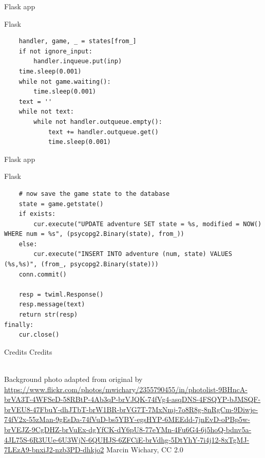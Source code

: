 \documentclass{beamer}
\def\py{
  \lstset{
     language=Python,
     extendedchars=true,
     basicstyle=\footnotesize\ttfamily,
     showstringspaces=false,
     showspaces=false,
     numbersep=9pt,
     tabsize=2,
     breaklines=true,
     showtabs=false,
     captionpos=b
  }
}
\begin{document}
\begin{frame}[fragile]{Flask app}
\begin{block}{Flask}
\py
\begin{lstlisting}
    handler, game, _ = states[from_]
    if not ignore_input:
        handler.inqueue.put(inp)
    time.sleep(0.001)
    while not game.waiting():
        time.sleep(0.001)
    text = ''
    while not text:
        while not handler.outqueue.empty():
            text += handler.outqueue.get()
            time.sleep(0.001)
\end{lstlisting}
\end{block}
\end{frame}
\begin{frame}[fragile]{Flask app}
\begin{block}{Flask}
\py
\begin{lstlisting}
    # now save the game state to the database
    state = game.getstate()
    if exists:
        cur.execute("UPDATE adventure SET state = %s, modified = NOW() WHERE num = %s", (psycopg2.Binary(state), from_))
    else:
        cur.execute("INSERT INTO adventure (num, state) VALUES (%s,%s)", (from_, psycopg2.Binary(state)))
    conn.commit()

    resp = twiml.Response()
    resp.message(text)
    return str(resp)
finally:
    cur.close()
\end{lstlisting}
\end{block}
\end{frame}

\begin{frame}{Credits}
Credits

\ \\
Background photo adapted from original by \url{https://www.flickr.com/photos/mwichary/2355790455/in/photolist-9BHncA-brVA3T-4WFSeD-58RBtP-4Ab3qP-brVJQK-74fVg4-asqDNS-4FSQYP-bJMSQF-brVEU8-47FbuY-dhJTbT-brW1BR-brVG7T-7MxNmj-7o8R8g-8nRgCm-9Diwje-74fV2x-55zMan-9gEsDa-74fVuD-bs5YBY-egsHYP-6MEEdd-7jnEvD-oPBp5w-brVEJZ-9CgDHZ-brVuEx-dgYfCK-dY6pU8-77eYMn-4Fu6G4-6j5hoQ-bdnv5a-4JL75S-6R3UUe-6U3WjN-6QUHJS-6ZFCiE-brVdhg-5DtYhY-7i4j12-8xTgMJ-7LEzA9-bnxiJ2-nzb3PD-dhkjo2} Marcin Wichary, CC 2.0
\end{frame}
\end{document}
